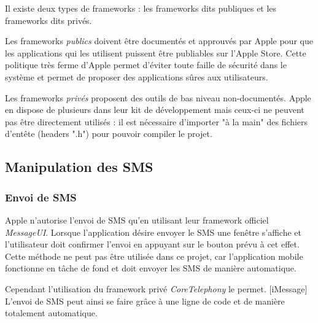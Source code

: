 Il existe deux types de frameworks : les frameworks dits publiques et les frameworks dits privés.

Les frameworks \textit{publics} doivent être documentés et approuvés par Apple pour que les applications qui les utilisent puissent être publiables sur l'Apple Store.
Cette politique très ferme d'Apple permet d'éviter toute faille de sécurité dans le système et permet de proposer des applications sûres aux utilisateurs.

Les frameworks \textit{privés} proposent des outils de bas niveau non-documentés.
Apple en dispose de plusieurs dans leur kit de développement mais ceux-ci ne peuvent pas être directement utilisés : il est nécessaire d'importer "à la main" des fichiers d'entête (headers ".h") pour pouvoir compiler le projet.




\subsection{Manipulation des SMS}


\subsubsection{Envoi de SMS}

Apple n'autorise l'envoi de SMS qu'en utilisant leur framework officiel \textit{MessageUI}.
Lorsque l'application désire envoyer le SMS une fenêtre s'affiche et l'utilisateur doit confirmer l'envoi en appuyant sur le bouton prévu à cet effet.
Cette méthode ne peut pas être utilisée dans ce projet, car l'application mobile fonctionne en tâche de fond et doit envoyer les SMS de manière automatique.

Cependant l'utilisation du framework privé \textit{CoreTelephony} le permet. [iMessage]
L'envoi de SMS peut ainsi se faire grâce à une ligne de code et de manière totalement automatique.


